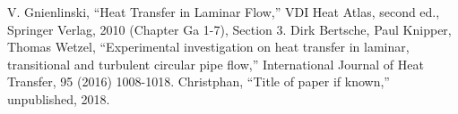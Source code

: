 \documentclass[conference]{IEEEtran}
\begin{document}
\begin{thebibliography}{00}
 V. Gnienlinski, ``Heat Transfer in Laminar Flow,'' VDI Heat Atlas, second ed., Springer Verlag, 2010 (Chapter Ga 1-7), Section 3.
 Dirk Bertsche, Paul Knipper, Thomas Wetzel, ``Experimental investigation on heat transfer in laminar, transitional and turbulent circular pipe flow,'' International Journal of Heat Transfer, 95 (2016) 1008-1018.
 Christphan, ``Title of paper if known,'' unpublished, 2018.


%
%

\end{thebibliography}
\end{document}
